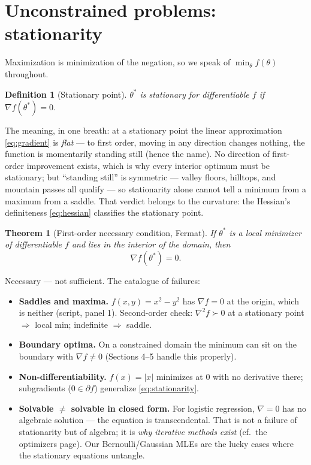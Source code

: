 \documentclass[11pt]{article}
\newtheorem{theorem}{Theorem}
\newtheorem{definition}{Definition}
\begin{document}
\section{Unconstrained problems: stationarity}

Maximization is minimization of the negation, so we speak of
$\min_\theta f(\theta)$ throughout.

\begin{definition}[Stationary point]
$\theta^\ast$ is \emph{stationary} for differentiable $f$ if
$\nabla f(\theta^\ast) = 0$.
\end{definition}

The meaning, in one breath: at a stationary point the linear
approximation \eqref{eq:gradient} is \emph{flat} --- to first order,
moving in any direction changes nothing, the function is momentarily
standing still (hence the name). No direction of first-order
improvement exists, which is why every interior optimum must be
stationary; but ``standing still'' is symmetric --- valley floors,
hilltops, and mountain passes all qualify --- so stationarity alone
cannot tell a minimum from a maximum from a saddle. That verdict
belongs to the curvature: the Hessian's definiteness
\eqref{eq:hessian} classifies the stationary point.

\begin{theorem}[First-order necessary condition, Fermat]
If $\theta^\ast$ is a local minimizer of differentiable $f$ and lies in
the \emph{interior} of the domain, then
\begin{equation}
  \nabla f(\theta^\ast) = 0 .
  \label{eq:stationarity}
\end{equation}
\end{theorem}

Necessary --- not sufficient. The catalogue of failures:
\begin{itemize}
  \item \textbf{Saddles and maxima.} $f(x,y)=x^2-y^2$ has
    $\nabla f = 0$ at the origin, which is neither (script, panel 1).
    Second-order check: $\nabla^2 f \succ 0$ at a stationary point
    $\Rightarrow$ local min; indefinite $\Rightarrow$ saddle.
  \item \textbf{Boundary optima.} On a constrained domain the minimum can
    sit on the boundary with $\nabla f \ne 0$ (Sections 4--5 handle this
    properly).
  \item \textbf{Non-differentiability.} $f(x)=|x|$ minimizes at $0$ with
    no derivative there; subgradients ($0 \in \partial f$) generalize
    \eqref{eq:stationarity}.
  \item \textbf{Solvable $\ne$ solvable in closed form.} For logistic
    regression, $\nabla = 0$ has no algebraic solution --- the equation is
    transcendental. That is not a failure of stationarity but of algebra;
    it is \emph{why iterative methods exist} (cf.\ the optimizers page).
    Our Bernoulli/Gaussian MLEs are the lucky cases where the stationary
    equations untangle.
\end{itemize}
\end{document}
